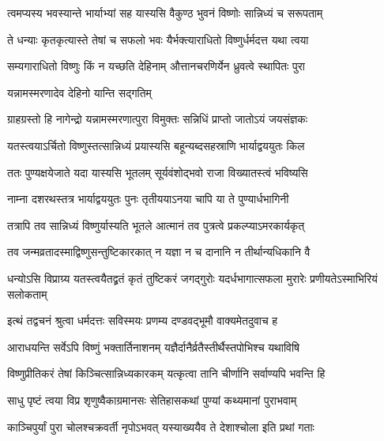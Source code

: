 \twolineshloka
{त्वमप्यस्य भवस्यान्ते भार्याभ्यां सह यास्यसि}
{वैकुण्ठ भुवनं विष्णोः सान्निध्यं च सरूपताम्} %

\twolineshloka
{ते धन्याः कृतकृत्यास्ते तेषां च सफलो भवः}
{यैर्भक्त्याराधितो विष्णुर्धर्मदत्त यथा त्वया} %

\twolineshloka
{सम्यगाराधितो विष्णुः किं न यच्छति देहिनाम्}
{औत्तानचरणिर्येन ध्रुवत्वे स्थापितः पुरा} %


\onelineshloka
{यन्नामस्मरणादेव देहिनो यान्ति सद्गतिम्} %

\twolineshloka
{ग्राहग्रस्तो हि नागेन्द्रो यन्नामस्मरणात्पुरा}
{विमुक्तः सन्निधिं प्राप्तो जातोऽयं जयसंज्ञकः} %

\twolineshloka
{यतस्त्वयाऽर्चितो विष्णुस्तत्सान्निध्यं प्रयास्यसि}
{बहून्यब्दसहस्राणि भार्याद्वययुतः किल} %

\twolineshloka
{ततः पुण्यक्षयेजाते यदा यास्यसि भूतलम्}
{सूर्यवंशोद्भवो राजा विख्यातस्त्वं भविष्यसि} %

\twolineshloka
{नाम्ना दशरथस्तत्र भार्याद्वययुतः पुनः}
{तृतीययाऽनया चापि या ते पुण्यार्धभागिनी} %

\twolineshloka
{तत्रापि तव सान्निध्यं विष्णुर्यास्यति भूतले}
{आत्मानं तव पुत्रत्वे प्रकल्प्याऽमरकार्यकृत्} %

\twolineshloka
{तव जन्मव्रतादस्माद्विष्णुसन्तुष्टिकारकात्}
{न यज्ञा न च दानानि न तीर्थान्यधिकानि वै} %

\twolineshloka
{धन्योऽसि विप्राग्र्य यतस्त्वयैतद्व्रतं कृतं तुष्टिकरं जगद्गुरोः}
{यदर्धभागात्सफला मुरारेः प्रणीयतेऽस्माभिरियं सलोकताम्} %





\twolineshloka
{इत्थं तद्वचनं श्रुत्वा धर्मदत्तः सविस्मयः}
{प्रणम्य दण्डवद्भूमौ वाक्यमेतदुवाच ह} %

\twolineshloka
{आराधयन्ति सर्वेऽपि विष्णुं भक्तार्तिनाशनम्}
{यज्ञैर्दानैर्व्रतैस्तीर्थैस्तपोभिश्च यथाविषि} %

\twolineshloka
{विष्णुप्रीतिकरं तेषां किञ्चित्सान्निध्यकारकम्}
{यत्कृत्वा तानि चीर्णानि सर्वाण्यपि भवन्ति हि} %


\twolineshloka
{साधु पृष्टं त्वया विप्र शृणुष्वैकाग्रमानसः}
{सेतिहासकथां पुण्यां कथ्यमानां पुराभवाम्} %


\twolineshloka
{काञ्चिपुर्यां पुरा चोलश्चक्रवर्ती नृपोऽभवत्}
{यस्याख्ययैव ते देशाश्चोला इति प्रथां गताः} %

